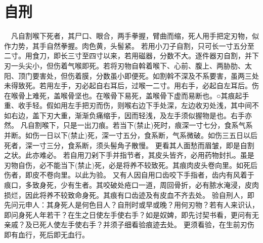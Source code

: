 \documentclass[12pt,UTF8]{ctexbook}
\begin{document}
\chapter{自刑}

　凡自割喉下死者，其尸口、眼合，两手拳握，臂曲而缩，死人用手把定刃物，似作力势，其手自然拳握。肉色黄，头髻紧。
若用小刀子自割，只可长一寸五分至二寸。用食刀，即长三寸至四寸以来，若用磁器，分数不大。逐件器刃自割，并下刃一头尖小，但伤着气喉即死。若将刃物自斡着喉下、心前、腹上、两胁肋、太阳、顶门要害处，但伤着膜，分数虽小即便死。如割斡不深及不系要害，虽两三处未得致死。若用左手，刃必起自右耳后，过喉一二寸。用右手，必起自左耳后。伤在喉骨上难死，盖喉骨坚也。在喉骨下易死，盖喉骨下虚而易断也。○其痕起手重、收手轻。假如用左手把刃而伤，则喉右边下手处深，左边收刃处浅，其中间不如右边，盖下刃大重，渐渐负痛缩手，因而轻浅，及左手须似握物是也。右手亦然。
凡自割喉下，只是一出刀痕。若当下(禁止)死时，痕深一寸七分，食系气系并断。如伤一日以下(禁止)死，深一寸五分，食系断，气系微破。如伤三五日以后死者，深一寸三分，食系断，须头髻角子散慢。
更看其人面愁而眉皱，即是自割之状。此亦难必。
若自用刀剁下手并指节者，其皮头皆齐，必用药物封扎。虽是刃物自伤，必不能当下(禁止)死，必是将养不较致死。其痕肉皮头卷向里。如死后伤者，即皮不卷向里。以此为验。
又有人因自用口齿咬下手指者，齿内有风着于痕口，多致身死，少有生者。其咬破处疮口一道，周回骨折，必有脓水淹浸，皮肉损烂，因此将养不较致命身死。其痕有口齿迹及有皮血不齐去处。
验自刑人，即先问元申人：其身死人是何色目人？自刑时或早或晚？用何刃物？若有人来识认，即问身死人年若干？在生之日使左手使右手？如是奴婢，即先讨契书看，更问有无亲戚？及已死人使左手使右手？并须子细看验痕迹去处。
更须看验，在生前刃伤即有血行，死后即无血行。
\end{document}
